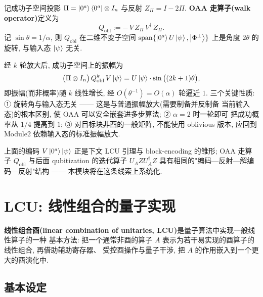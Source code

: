\documentclass[utf8]{article} %
\numberwithin{equation}{section}   %
\newtheorem{Def}{\hskip 2em {\color{green} 定义}}[subsection]
\newtheorem{Note}{\hskip 2em {\color{red} 注}}[subsection]
\begin{document}
\begin{Def}
    记成功子空间投影 $\Pi = \ket{0^a}\bra{0^a}\otimes I_n$ 与反射
    $Z_\Pi = I - 2\Pi$. \textbf{OAA 走算子(walk operator)}定义为
    \begin{equation}
        Q_{\mathrm{obl}} := -\, V\, Z_\Pi\, V^\dagger\, Z_\Pi.
    \end{equation}
    记 $\sin\theta = 1/\alpha$, 则 $Q_{\mathrm{obl}}$ 在二维不变子空间
    $\mathrm{span}\{\ket{0^a}U\ket{\psi}, \ket{\Phi^\perp}\}$ 上是角度
    $2\theta$ 的旋转, 与输入态 $\ket{\psi}$ 无关.
\end{Def}

\begin{Note}[几何与关键性质]
    经 $k$ 轮放大后, 成功子空间上的振幅为
    \begin{equation}
        \big(\Pi \otimes I_n\big)\, Q_{\mathrm{obl}}^k\, V\ket{\psi}
        = U\ket{\psi}\cdot \sin\big((2k+1)\theta\big),
    \end{equation}
    即振幅(而非概率)随 $k$ 线性增长, 经 $O(\theta^{-1}) = O(\alpha)$ 轮逼近 $1$.
    三个关键性质: ① 旋转角与输入态无关 —— 这是与普通振幅放大(需要制备并反制备
    当前输入态)的根本区别, 使 OAA 可以安全嵌套进多步算法; ② $\alpha = 2$ 时一轮即可
    把成功概率从 $1/4$ 提高到 $1$; ③ 对目标块非酉的一般矩阵, 不能使用 oblivious
    版本, 应回到 Module2 依赖输入态的标准振幅放大.
\end{Note}

\begin{Note}[与后面的联系]
    上面的编码 $V\ket{0^a}\ket{\psi}$ 正是下文 LCU 引理与 block-encoding 的雏形;
    OAA 走算子 $Q_{\mathrm{obl}}$ 与后面 qubitization 的迭代算子 $U_A Z U_A^\dagger Z$
    具有相同的"编码—反射—解编码—反射"结构 —— 本模块将在这条线索上系统化.
\end{Note}

\section{LCU: 线性组合的量子实现}

\textbf{线性组合酉(linear combination of unitaries, LCU)}是量子算法中实现一般线性算子的一种
基本方法: 把一个通常非酉的算子 $A$ 表示为若干易实现的酉算子的线性组合, 再借助辅助寄存器、
受控酉操作与量子干涉, 把 $A$ 的作用嵌入到一个更大的酉演化中.

\subsection{基本设定}
\end{document}
